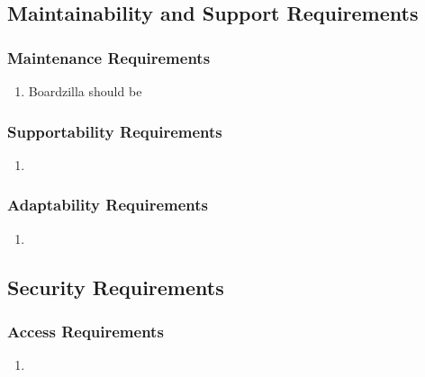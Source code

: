 \documentclass[]{article}
\begin{document}

\subsection{Maintainability and Support Requirements}
\label{sub:maintainability_and_support_requirements}

\subsubsection{Maintenance Requirements}
\label{ssub:maintenance_requirements}
\begin{enumerate}[{MS}1. ]
	\item Boardzilla should be 
\end{enumerate}

\subsubsection{Supportability Requirements}
\label{ssub:supportability_requirements}
\begin{enumerate}[{MS}1. ]
	\item 
\end{enumerate}

\subsubsection{Adaptability Requirements}
\label{ssub:adaptability_requirements}
\begin{enumerate}[{MS}1. ]
	\item 
\end{enumerate}


\subsection{Security Requirements}
\label{sub:security_requirements}

\subsubsection{Access Requirements}
\label{ssub:access_requirements}
\begin{enumerate}[{SR}1. ]
	\item 
\end{enumerate}
\end{document}

